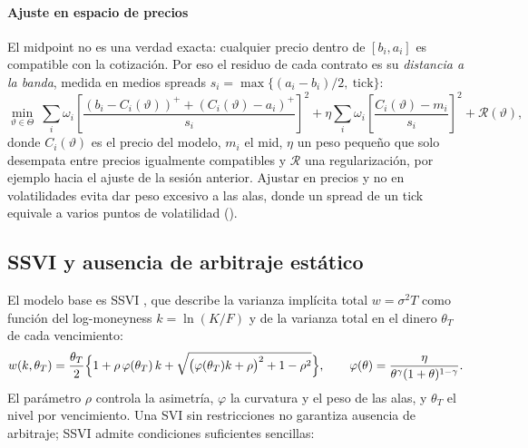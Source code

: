 
\paragraph{Ajuste en espacio de precios} El midpoint no es una verdad exacta: cualquier precio dentro de
$[b_i,a_i]$ es compatible con la cotización. Por eso el residuo de cada contrato es su \emph{distancia a la
banda}, medida en medios spreads $s_i=\max\{(a_i-b_i)/2,\ \text{tick}\}$:
\begin{equation}
\min_{\vartheta\in\Theta}\ \sum_i \omega_i\left[\frac{(b_i-C_i(\vartheta))^+ + (C_i(\vartheta)-a_i)^+}{s_i}\right]^2
+\eta\sum_i \omega_i\left[\frac{C_i(\vartheta)-m_i}{s_i}\right]^2+\mathcal{R}(\vartheta),
\label{eq:perdida_banda}
\end{equation}
donde $C_i(\vartheta)$ es el precio del modelo, $m_i$ el mid, $\eta$ un peso pequeño que solo desempata
entre precios igualmente compatibles y $\mathcal R$ una regularización, por ejemplo hacia el ajuste de la
sesión anterior. Ajustar en precios y no en volatilidades evita dar peso excesivo a las alas, donde un
spread de un tick equivale a varios puntos de volatilidad ().



\subsection{SSVI y ausencia de arbitraje estático}\label{sec:ssvi}

El modelo base es SSVI \citep{gatheral2014}, que describe la varianza implícita total $w=\sigma^2T$ como
función del log-moneyness $k=\ln(K/F)$ y de la varianza total en el dinero $\theta_T$ de cada vencimiento:
\begin{equation}
w(k,\theta_T)=\frac{\theta_T}{2}\Bigl\{1+\rho\,\varphi(\theta_T)\,k+\sqrt{\bigl(\varphi(\theta_T)k+\rho\bigr)^2+1-\rho^2}\Bigr\},
\qquad \varphi(\theta)=\frac{\eta}{\theta^{\gamma}(1+\theta)^{1-\gamma}}.
\label{eq:ssvi}
\end{equation}
El parámetro $\rho$ controla la asimetría, $\varphi$ la curvatura y el peso de las alas, y $\theta_T$ el
nivel por vencimiento. Una SVI sin restricciones no garantiza ausencia de arbitraje; SSVI admite
condiciones suficientes sencillas:

